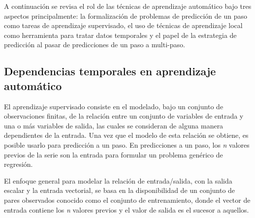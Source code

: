 \documentclass{llncs}
\begin{document}
A continuación se revisa el rol de las técnicas de aprendizaje automático bajo tres aspectos principalmente: la formalización de problemas de predicción de un paso como tareas de aprendizaje supervisado, el uso de técnicas de aprendizaje local como herramienta para tratar datos temporales y el papel de la estrategia de predicción al pasar de predicciones de un paso a multi-paso. 

\subsection{Dependencias temporales en aprendizaje automático}

El aprendizaje supervisado consiste en el modelado, bajo un conjunto de observaciones finitas, de la relación entre un conjunto de variables de entrada y una o más variables de salida, las cuales se consideran de alguna manera dependientes de la entrada. Una vez que el modelo de esta relación se obtiene, es posible usarlo para predicción a un paso. En predicciones a un paso, los \emph{n} valores previos de la serie son la entrada para formular un problema genérico de regresión. 

El enfoque general para modelar la relación de entrada/salida, con la salida escalar y la entrada vectorial, se basa en la disponibilidad de un conjunto de pares observados conocido como el conjunto de entrenamiento, donde el vector de entrada contiene los \emph{n} valores previos y el valor de salida es el sucesor a aquellos.
\end{document}
